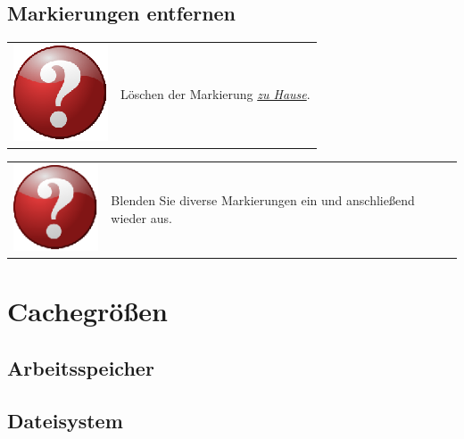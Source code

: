 \documentclass[10pt]{scrreprt}
\begin{document}
\vspace{3mm}
\subsection{Markierungen entfernen}  

\vspace{3mm}
\begin{tabular}{>{\centering \arraybackslash}m{1cm} m{14cm}}
\includegraphics[scale=0.5]{images/quest.eps} & Löschen der Markierung \underline{\textit{zu Hause}}.
\end{tabular}



\vspace{3mm}
\begin{tabular}{>{\centering \arraybackslash}m{1cm} m{14cm}}
\includegraphics[scale=0.5]{images/quest.eps} & Blenden Sie diverse Markierungen ein und anschließend wieder aus.
\end{tabular}





\vspace{3mm}
\section{Cachegrößen} 

\vspace{3mm}
\subsection{Arbeitsspeicher}  

\vspace{3mm}
\subsection{Dateisystem}  
\end{document}
